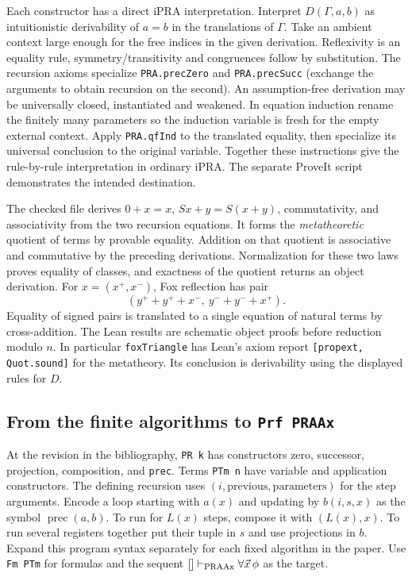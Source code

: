 Each constructor has a direct iPRA interpretation. Interpret $D(\Gamma,a,b)$ as intuitionistic derivability of $a=b$ in the translations of $\Gamma$. Take an ambient context large enough for the free indices in the given derivation. Reflexivity is an equality rule, symmetry/transitivity and congruences follow by substitution. The recursion axioms specialize \texttt{PRA.precZero} and \texttt{PRA.precSucc} (exchange the arguments to obtain recursion on the second). An assumption-free derivation may be universally closed, instantiated and weakened. In equation induction rename the finitely many parameters so the induction variable is fresh for the empty external context. Apply \texttt{PRA.qfInd} to the translated equality, then specialize its universal conclusion to the original variable. Together these instructions give the rule-by-rule interpretation in ordinary iPRA. The separate ProveIt script demonstrates the intended destination.

The checked file derives $0+x=x$, $Sx+y=S(x+y)$, commutativity, and associativity from the two recursion equations. It forms the \emph{metatheoretic} quotient of terms by provable equality. Addition on that quotient is associative and commutative by the preceding derivations. Normalization for these two laws proves equality of classes, and exactness of the quotient returns an object derivation. For $x=(x^+,x^-)$, Fox reflection has pair
\[
  (y^++y^++x^-,\ y^-+y^-+x^+).
\]
Equality of signed pairs is translated to a single equation of natural terms by cross-addition. The Lean results are schematic object proofs before reduction modulo $n$. In particular \texttt{foxTriangle} has Lean's axiom report \texttt{[propext, Quot.sound]} for the metatheory. Its conclusion is derivability using the displayed rules for $D$.

\subsection{From the finite algorithms to \texttt{Prf PRAAx}}
At the revision in the bibliography, \texttt{PR k} has constructors zero, successor, projection, composition, and \texttt{prec}. Terms \texttt{PTm n} have variable and application constructors. The defining recursion uses $(i,\mathrm{previous},\mathrm{parameters})$ for the step arguments. Encode a loop starting with $a(x)$ and updating by $b(i,s,x)$ as the symbol $\operatorname{prec}(a,b)$. To run for $L(x)$ steps, compose it with $(L(x),x)$. To run several registers together put their tuple in $s$ and use projections in $b$. Expand this program syntax separately for each fixed algorithm in the paper. Use \texttt{Fm PTm} for formulas and the sequent $[]\mathrel{\vdash_{\rm PRAAx}}\forall\vec x\,\phi$ as the target.

